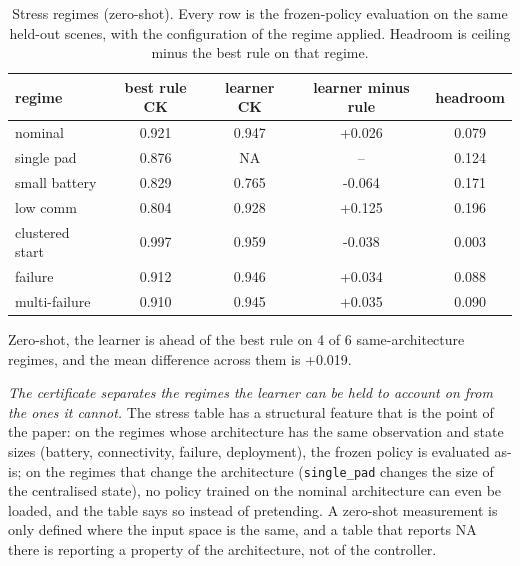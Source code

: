 \begin{table}[t]
\caption{Stress regimes (zero-shot).  Every row is the frozen-policy
evaluation on the same held-out scenes, with the configuration of the regime
applied.  Headroom is ceiling minus the best rule on that regime.}
\label{tab:stress}
\centering
\scriptsize
\setlength{\tabcolsep}{3pt}
\begin{tabular}{@{}lcccc@{}}
\toprule
regime & best rule CK & learner CK & learner minus rule & headroom \\
\midrule
nominal        & 0.921 & 0.947 & +0.026 & 0.079 \\
single pad     & 0.876 & NA & -- & 0.124 \\
small battery  & 0.829 & 0.765 & -0.064 & 0.171 \\
low comm       & 0.804 & 0.928 & +0.125 & 0.196 \\
clustered start & 0.997 & 0.959 & -0.038 & 0.003 \\
failure        & 0.912 & 0.946 & +0.034 & 0.088 \\
multi-failure  & 0.910 & 0.945 & +0.035 & 0.090 \\
\bottomrule
\end{tabular}
\end{table}

Zero-shot, the learner is ahead of the best rule on 4 of 6 same-architecture regimes, and the mean difference across them is +0.019.


\emph{The certificate separates the regimes the learner can be held to
account on from the ones it cannot.}  The stress table has a structural
feature that is the point of the paper: on the regimes whose architecture
has the same observation and state sizes (battery, connectivity, failure,
deployment), the frozen policy is evaluated as-is; on the regimes that
change the architecture (\texttt{single\_pad} changes the size of the
centralised state), no policy trained on the nominal architecture can even
be loaded, and the table says so instead of pretending.  A zero-shot
measurement is only defined where the input space is the same, and a table
that reports NA there is reporting a property of the architecture, not of
the controller.



